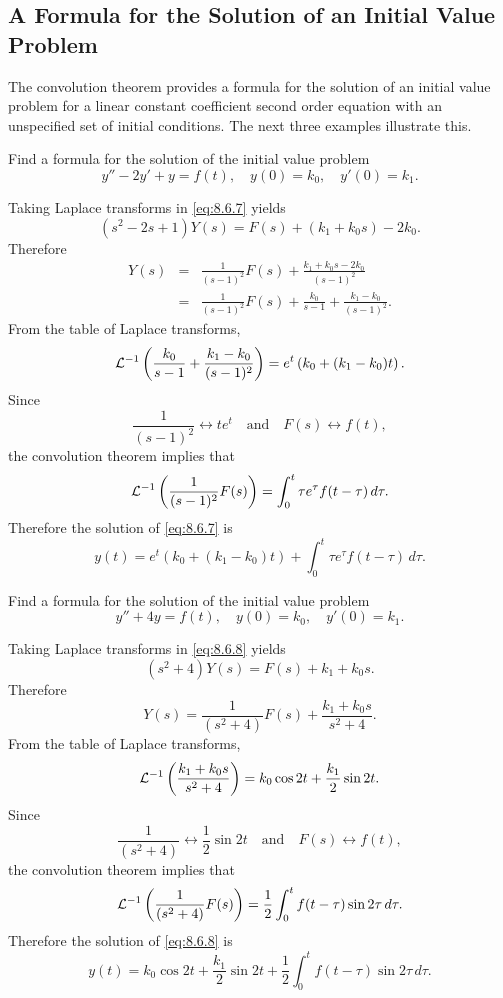 \documentclass{ximera}
\begin{document}
\subsection*{A Formula for the Solution of an Initial Value Problem}

The convolution theorem provides a formula for the
solution of an initial value problem for a linear constant coefficient
second order equation with an unspecified set of initial conditions.
The next three examples illustrate this.

\begin{example}\label{example:8.6.2}
 Find a formula for the solution of the initial value problem
\begin{equation}\label{eq:8.6.7}
y''-2y'+y=f(t),\quad  y(0)=k_0,\quad y'(0)=k_1.
\end{equation}
\begin{explanation}
Taking Laplace transforms in \eqref{eq:8.6.7} yields
$$
(s^2-2s+1)Y(s)=F(s)+(k_1+k_0s)-2k_0.
$$
Therefore
\begin{eqnarray*}
Y(s)&=&\frac{1}{(s-1)^2}F(s)+\frac{k_1+k_0s-2k_0}{(s-1)^2}\\
&=&\frac{1}{(s-1)^2}F(s)+\frac{k_0}{s-1}+\frac{k_1-k_0}{(s-1)^2}.
\end{eqnarray*}
From the table of Laplace transforms,
$$
{\cal L}^{-1}\left(\frac{k_0}{s-1}+\frac{k_1-k_0}{(s-1)^2}\right)
=e^t\left(k_0+(k_1-k_0)t\right).
$$
Since
$$
\frac{1}{(s-1)^2}\leftrightarrow te^t\quad\mbox{and}\quad F(s)
\leftrightarrow f(t),
$$
the convolution theorem implies that
$$
{\cal L}^{-1}
\left(\frac{1}{(s-1)^2}F(s)\right)=
\int_0^t\tau e^\tau f(t-\tau)\,d\tau.
$$
Therefore the solution of  \eqref{eq:8.6.7} is
$$
y(t)=e^t\left(k_0+(k_1-k_0)t\right)+\int_0^t\tau e^\tau f(t-\tau)\,
d\tau.
$$
\end{explanation}
\end{example}

\begin{example}\label{example:8.6.3}
 Find a formula for the solution of the initial value problem
\begin{equation}\label{eq:8.6.8}
y''+4y=f(t),\quad y(0)=k_0,\quad y'(0)=k_1.
\end{equation}
\begin{explanation}
Taking Laplace transforms in \eqref{eq:8.6.8} yields
$$
(s^2+4)Y(s) =F(s)+k_1+k_0s.
$$
Therefore
$$
Y(s) =\frac{1}{(s^2+4)}F(s)+\frac{k_1+k_0s}{s^2+4}.
$$
From the table of Laplace transforms,
$$
{\cal L}^{-1}\left(\frac{k_1+k_0s}{s^2+4}\right)=k_0\cos 2t+\frac{k_1}{2}\sin 2t.
$$
Since
$$
\frac{1}{(s^2+4)}\leftrightarrow \frac{1}{2}\sin 2t\quad\mbox{and}\quad
F(s)\leftrightarrow f(t),
$$
the convolution theorem implies that
$$
{\cal L}^{-1}\left(\frac{1}{(s^2+4)}F(s)\right)=
 \frac{1}{2}\int_0^t  f(t-\tau)\sin 2\tau\,
d\tau.
$$
Therefore the solution of  \eqref{eq:8.6.8} is
$$
y(t)=k_0\cos 2t+\frac{k_1}{2}\sin 2t+\frac{1}{2}\int_0^tf(t-\tau)\sin
2\tau\,d\tau.
$$
\end{explanation}
\end{example}
\end{document}
